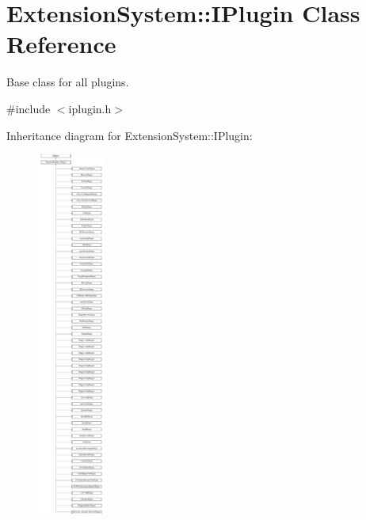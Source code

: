 \hypertarget{class_extension_system_1_1_i_plugin}{\section{Extension\-System\-:\-:I\-Plugin Class Reference}
\label{class_extension_system_1_1_i_plugin}
}


Base class for all plugins.  




{\ttfamily \#include $<$iplugin.\-h$>$}

Inheritance diagram for Extension\-System\-:\-:I\-Plugin\-:\begin{figure}[H]
\begin{center}
\leavevmode
\includegraphics[height=12.000000cm]{class_extension_system_1_1_i_plugin}
\end{center}
\end{figure}

